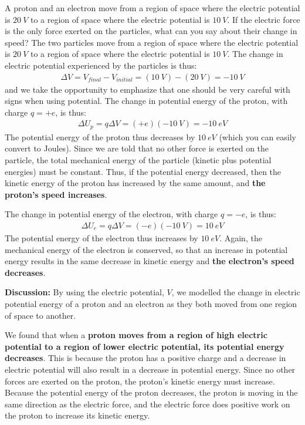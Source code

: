 \begin{example}{A proton and an electron move from a region of space where the electric potential is $\SI{20}{V}$ to a region of space where the electric potential is $\SI{10}{V}$. If the electric force is the only force exerted on the particles, what can you say about their change in speed?}
The two particles move from a region of space where the electric potential is $\SI{20}{V}$ to a region of space where the electric potential is $\SI{10}{V}$. The change in electric potential experienced by the particles is thus:
\begin{align*}
\Delta V = V_{final}-V_{initial}=(\SI{10}{V})-(\SI{20}{V})=\SI{-10}{V}
\end{align*}
and we take the opportunity to emphasize that one should be very careful with signs when using potential. The change in potential energy of the proton, with charge $q=+e$, is thus:
\begin{align*}
\Delta U_p=q\Delta V = (+e)(\SI{-10}{V})=\SI{-10}{eV}
\end{align*}
The potential energy of the proton thus decreases by $\SI{10}{eV}$ (which you can easily convert to Joules). Since we are told that no other force is exerted on the particle, the total mechanical energy of the particle (kinetic plus potential energies) must be constant. Thus, if the potential energy decreased, then the kinetic energy of the proton has increased by the same amount, and \textbf{the proton's speed increases}. 

The change in potential energy of the electron, with charge $q=-e$, is thus:
\begin{align*}
\Delta U_e=q\Delta V = (-e)(\SI{-10}{V}) = \SI{10}{eV}
\end{align*}
The potential energy of the electron thus increases by $\SI{10}{eV}$. Again, the mechanical energy of the electron is conserved, so that an increase in potential energy results in the same decrease in kinetic energy and \textbf{the electron's speed decreases}.

\textbf{Discussion: }By using the electric potential, $V$, we modelled the change in electric potential energy of a proton and an electron as they both moved from one region of space to another.

We found that when a \textbf{proton moves from a region of high electric potential to a region of lower electric potential, its potential energy decreases}. This is because the proton has a positive charge and a decrease in electric potential will also result in a decrease in potential energy. Since no other forces are exerted on the proton, the proton's kinetic energy must increase. Because the potential energy of the proton decreases, the proton is moving in the same direction as the electric force, and the electric force does positive work on the proton to increase its kinetic energy.


\end{example}
